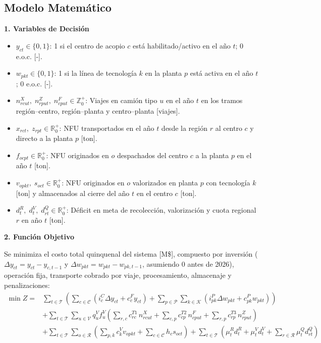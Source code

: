 \documentclass[letterpaper]{article}
\begin{document}
\subsection{Modelo Matemático}

\textbf{1. Variables de Decisión}
\begin{itemize}\setlength{\itemsep}{1pt}\setlength{\parskip}{0pt}
    \item $y_{ct} \in \{0,1\}$: 1 si el centro de acopio $c$ está habilitado/activo en el año $t$; 0 e.o.c. [-].
    \item $w_{pkt} \in \{0,1\}$: 1 si la línea de tecnología $k$ en la planta $p$ está activa en el año $t$; 0 e.o.c. [-].
    \item $n^{X}_{rcut},\; n^{Z}_{rput},\; n^{F}_{cput} \in \mathbb{Z}_{0}^{+}$: Viajes en camión tipo $u$ en el año $t$ en los tramos región--centro, región--planta y centro--planta [viajes].
    \item $x_{rct},\; z_{rpt} \in \mathbb{R}_{0}^{+}$: NFU transportados en el año $t$ desde la región $r$ al centro $c$ y directo a la planta $p$ [ton].
    \item $f_{ocpt} \in \mathbb{R}_{0}^{+}$: NFU originados en $o$ despachados del centro $c$ a la planta $p$ en el año $t$ [ton].
    \item $v_{opkt},\; s_{oct} \in \mathbb{R}_{0}^{+}$: NFU originados en $o$ valorizados en planta $p$ con tecnología $k$ [ton] y almacenados al cierre del año $t$ en el centro $c$ [ton].
    \item $d^{R}_{t},\; d^{V}_{t},\; d^{Q}_{rt} \in \mathbb{R}_{0}^{+}$: Déficit en meta de recolección, valorización y cuota regional $r$ en año $t$ [ton].
\end{itemize}

\textbf{2. Función Objetivo}

Se minimiza el costo total quinquenal del sistema [M\$], compuesto por inversión ($\Delta y_{ct} = y_{ct} - y_{c,t-1}$ y $\Delta w_{pkt} = w_{pkt} - w_{pk,t-1}$, asumiendo 0 antes de 2026), operación fija, transporte cobrado por viaje, procesamiento, almacenaje y penalizaciones:
\begin{align*}
\min Z =& \sum_{t \in \mathcal{T}} \left( \sum_{c \in \mathcal{C}} \left( i^{C}_{c} \Delta y_{ct} + c^{F}_{c} y_{ct} \right) + \sum_{p \in \mathcal{P}} \sum_{k \in \mathcal{K}} \left( i^{P}_{pk} \Delta w_{pkt} + c^{P}_{pk} w_{pkt} \right) \right) \\
& + \sum_{t \in \mathcal{T}} \sum_{u \in \mathcal{V}} q^{V}_{u} f^{V}_{u} \left( \sum_{r,c} c^{T1}_{rc}\, n^{X}_{rcut} + \sum_{c,p} c^{T2}_{cp}\, n^{F}_{cput} + \sum_{r,p} c^{T3}_{rp}\, n^{Z}_{rput} \right) \\
& + \sum_{t \in \mathcal{T}} \sum_{o \in \mathcal{R}} \left( \sum_{p,k} c^{V}_{k} v_{opkt} + \sum_{c \in \mathcal{C}} h_{c} s_{oct} \right) + \sum_{t \in \mathcal{T}} \left( \mu^{R}_{t} d^{R}_{t} + \mu^{V}_{t} d^{V}_{t} + \sum_{r \in \mathcal{R}} \mu^{Q}_{t} d^{Q}_{rt} \right)
\end{align*}
\end{document}
